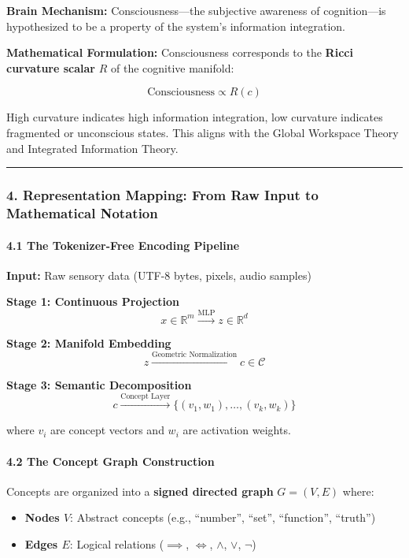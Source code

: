 \documentclass[
  11pt,
  a4paper,
]{article}
\providecommand{\tightlist}{%
  \setlength{\itemsep}{0pt}\setlength{\parskip}{0pt}}
\begin{document}
\textbf{Brain Mechanism:} Consciousness---the subjective awareness of
cognition---is hypothesized to be a property of the system's information
integration.

\textbf{Mathematical Formulation:} Consciousness corresponds to the
\textbf{Ricci curvature scalar} \(R\) of the cognitive manifold:

\[\text{Consciousness} \propto R(c)\]

High curvature indicates high information integration, low curvature
indicates fragmented or unconscious states. This aligns with the Global
Workspace Theory and Integrated Information Theory.

\begin{center}\rule{0.5\linewidth}{0.5pt}\end{center}

\subsubsection{4. Representation Mapping: From Raw Input to Mathematical
Notation}\label{representation-mapping-from-raw-input-to-mathematical-notation}

\paragraph{4.1 The Tokenizer-Free Encoding
Pipeline}\label{the-tokenizer-free-encoding-pipeline}

\textbf{Input:} Raw sensory data (UTF-8 bytes, pixels, audio samples)

\textbf{Stage 1: Continuous Projection}
\[x \in \mathbb{R}^m \xrightarrow{\text{MLP}} z \in \mathbb{R}^d\]

\textbf{Stage 2: Manifold Embedding}
\[z \xrightarrow{\text{Geometric Normalization}} c \in \mathcal{C}\]

\textbf{Stage 3: Semantic Decomposition}
\[c \xrightarrow{\text{Concept Layer}} \{(v_1, w_1), \dots, (v_k, w_k)\}\]

where \(v_i\) are concept vectors and \(w_i\) are activation weights.

\paragraph{4.2 The Concept Graph
Construction}\label{the-concept-graph-construction}

Concepts are organized into a \textbf{signed directed graph}
\(G = (V, E)\) where:

\begin{itemize}
\tightlist
\item
  \textbf{Nodes \(V\)}: Abstract concepts (e.g., ``number'', ``set'',
  ``function'', ``truth'')
\item
  \textbf{Edges \(E\)}: Logical relations (\(\implies\), \(\iff\),
  \(\land\), \(\lor\), \(\neg\))
\end{itemize}
\end{document}
